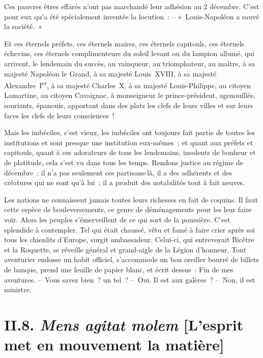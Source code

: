 \documentclass[french,twoside]{book} %
\begin{document}
Ces pauvres êtres effarés n’ont pas marchandé leur adhésion au 2 décembre. C’est pour eux qu’a été spécialement inventée la locution : – « Louis-Napoléon a sauvé la société. »\par
Et ces éternels préfets, ces éternels maires, ces éternels capitouls, ces éternels échevins, ces éternels complimenteurs du soleil levant ou du lampion allumé, qui arrivent, le lendemain du succès, au vainqueur, au triomphateur, au maître, à sa majesté Napoléon le Grand, à sa majesté Louis XVIII, à sa majesté Alexandre I\textsuperscript{er}, à sa majesté Charles X, à sa majesté Louis-Philippe, au citoyen Lamartine, au citoyen Cavaignac, à monseigneur le prince-président, agenouillés, souriants, épanouis, apportant dans des plats les clefs de leurs villes et sur leurs faces les clefs de leurs consciences !\par
Mais les imbéciles, c’est vieux, les imbéciles ont toujours fait partie de toutes les institutions et sont presque une institution eux-mêmes ; et quant aux préfets et capitouls, quant à ces adorateurs de tous les lendemains, insolents de bonheur et de platitude, cela s’est vu dans tous les temps. Rendons justice au régime de décembre ; il n’a pas seulement ces partisans-là, il a des adhérents et des créatures qui ne sont qu’à lui ; il a produit des notabilités tout à fait neuves.\par
Les nations ne connaissent jamais toutes leurs richesses en fait de coquins. Il faut cette espèce de bouleversements, ce genre de déménagements pour les leur faire voir. Alors les peuples s’émerveillent de ce qui sort de la poussière. C’est splendide à contempler. Tel qui était chaussé, vêtu et famé à faire crier après soi tous les chienlits d’Europe, surgit ambassadeur. Celui-ci, qui entrevoyait Bicêtre et la Roquette, se réveille général et grand-aigle de la Légion d’honneur. Tout aventurier endosse un habit officiel, s’accommode un bon oreiller bourré de billets de banque, prend une feuille de papier blanc, et écrit dessus : Fin de mes aventures. – Vous savez bien ? un tel ? – Oui. Il est aux galères ? – Non, il est ministre.

\section[{II.8. Mens agitat molem [L’esprit met en mouvement la matière]}]{II.8. \emph{Mens agitat molem} [L’esprit met en mouvement la matière]}
\end{document}
